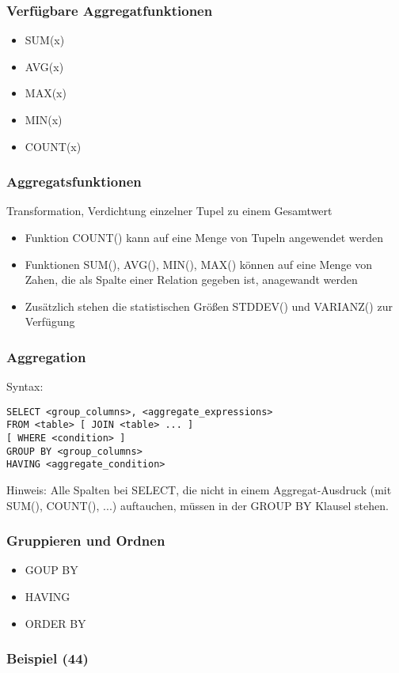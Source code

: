 \subsubsection{Verfügbare Aggregatfunktionen}
\begin{itemize}
	\item SUM(x)
	\item AVG(x)
	\item MAX(x)
	\item MIN(x)
	\item COUNT(x)
\end{itemize}
\subsubsection{Aggregatsfunktionen}
Transformation, Verdichtung einzelner Tupel zu einem Gesamtwert
\begin{itemize}
	\item Funktion COUNT() kann auf eine Menge von Tupeln angewendet werden
	\item Funktionen SUM(), AVG(), MIN(), MAX() können auf eine Menge von Zahen, die als Spalte einer Relation gegeben ist, anagewandt werden
	\item Zusätzlich stehen die statistischen Größen STDDEV() und VARIANZ() zur Verfügung
\end{itemize}
\subsubsection{Aggregation}
Syntax: 
\begin{lstlisting}
SELECT <group_columns>, <aggregate_expressions>
FROM <table> [ JOIN <table> ... ]
[ WHERE <condition> ]
GROUP BY <group_columns>
HAVING <aggregate_condition>
\end{lstlisting}
Hinweis: Alle Spalten bei SELECT, die nicht in einem Aggregat-Ausdruck (mit SUM(), COUNT(), ...) auftauchen, müssen in der GROUP BY Klausel stehen.
\subsubsection{Gruppieren und Ordnen}
\begin{itemize}
	\item GOUP BY
	\item HAVING
	\item ORDER BY
\end{itemize}
\subsubsection{Beispiel (44)}


